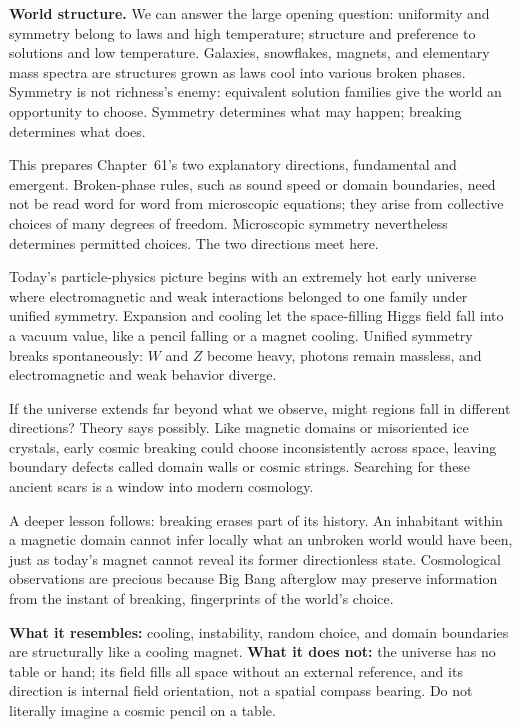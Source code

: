 \begin{mainline}
\textbf{World structure.} We can answer the large opening question: uniformity and symmetry belong to laws and high temperature; structure and preference to solutions and low temperature. Galaxies, snowflakes, magnets, and elementary mass spectra are structures grown as laws cool into various broken phases. Symmetry is not richness's enemy: equivalent solution families give the world an opportunity to choose. Symmetry determines what may happen; breaking determines what does.

This prepares Chapter~61's two explanatory directions, fundamental and emergent. Broken-phase rules, such as sound speed or domain boundaries, need not be read word for word from microscopic equations; they arise from collective choices of many degrees of freedom. Microscopic symmetry nevertheless determines permitted choices. The two directions meet here.
\end{mainline}


\begin{thought}
Today's particle-physics picture begins with an extremely hot early universe where electromagnetic and weak interactions belonged to one family under unified symmetry. Expansion and cooling let the space-filling Higgs field fall into a vacuum value, like a pencil falling or a magnet cooling. Unified symmetry breaks spontaneously: \(W\) and \(Z\) become heavy, photons remain massless, and electromagnetic and weak behavior diverge.

If the universe extends far beyond what we observe, might regions fall in different directions? Theory says possibly. Like magnetic domains or misoriented ice crystals, early cosmic breaking could choose inconsistently across space, leaving boundary defects called domain walls or cosmic strings. Searching for these ancient scars is a window into modern cosmology.

A deeper lesson follows: breaking erases part of its history. An inhabitant within a magnetic domain cannot infer locally what an unbroken world would have been, just as today's magnet cannot reveal its former directionless state. Cosmological observations are precious because Big Bang afterglow may preserve information from the instant of breaking, fingerprints of the world's choice.

\textbf{What it resembles:} cooling, instability, random choice, and domain boundaries are structurally like a cooling magnet. \textbf{What it does not:} the universe has no table or hand; its field fills all space without an external reference, and its direction is internal field orientation, not a spatial compass bearing. Do not literally imagine a cosmic pencil on a table.
\end{thought}

